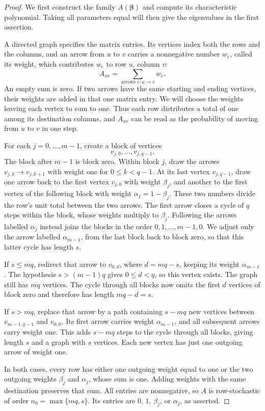 \documentclass[11pt,a4paper]{article}
\theoremstyle{definition}
\theoremstyle{remark}
\numberwithin{equation}{section}
\begin{document}
\begin{proof}
We first construct the family $A(\boldsymbol\beta)$ and compute its characteristic polynomial. Taking all parameters equal will then give the eigenvalues in the first assertion.

A directed graph specifies the matrix entries. Its vertices index both the rows and the columns, and an arrow from $u$ to $v$ carries a nonnegative number $w_e$, called its weight, which contributes $w_e$ to row $u$, column $v$:
\[
 A_{uv}=\sum_{\text{arrows }e:u\to v}w_e.
\]
An empty sum is zero. If two arrows have the same starting and ending vertices, their weights are added in that one matrix entry. We will choose the weights leaving each vertex to sum to one. Thus each row distributes a total of one among its destination columns, and $A_{uv}$ can be read as the probability of moving from $u$ to $v$ in one step.

For each $j=0,\ldots,m-1$, create a block of vertices
\[
 v_{j,0},\ldots,v_{j,q-1}.
\]
The block after $m-1$ is block zero. Within block $j$, draw the arrows $v_{j,k}\to v_{j,k+1}$ with weight one for $0\le k<q-1$. At its last vertex $v_{j,q-1}$, draw one arrow back to the first vertex $v_{j,0}$ with weight $\beta_j$, and another to the first vertex of the following block with weight $\alpha_j=1-\beta_j$. These two numbers divide the row's unit total between the two arrows. The first arrow closes a cycle of $q$ steps within the block, whose weights multiply to $\beta_j$. Following the arrows labelled $\alpha_j$ instead joins the blocks in the order $0,1,\ldots,m-1,0$. We adjust only the arrow labelled $\alpha_{m-1}$, from the last block back to block zero, so that this latter cycle has length $s$.

If $s\le mq$, redirect that arrow to $v_{0,d}$, where $d=mq-s$, keeping its weight $\alpha_{m-1}$. The hypothesis $s>(m-1)q$ gives $0\le d<q$, so this vertex exists. The graph still has $mq$ vertices. The cycle through all blocks now omits the first $d$ vertices of block zero and therefore has length $mq-d=s$.

If $s>mq$, replace that arrow by a path containing $s-mq$ new vertices between $v_{m-1,q-1}$ and $v_{0,0}$. Its first arrow carries weight $\alpha_{m-1}$, and all subsequent arrows carry weight one. This adds $s-mq$ steps to the cycle through all blocks, giving length $s$ and a graph with $s$ vertices. Each new vertex has just one outgoing arrow of weight one.

In both cases, every row has either one outgoing weight equal to one or the two outgoing weights $\beta_j$ and $\alpha_j$, whose sum is one. Adding weights with the same destination preserves that sum. All entries are nonnegative, so $A$ is row-stochastic of order $n_0=\max\{mq,s\}$. Its entries are $0$, $1$, $\beta_j$, or $\alpha_j$, as asserted.


\end{proof}
\end{document}
